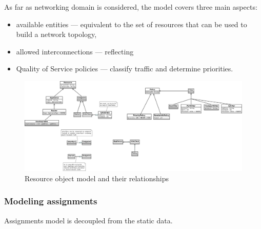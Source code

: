 \documentclass[11pt]{book}
\begin{document}
          As far as networking domain is considered, the model covers three main aspects:

          \begin{itemize}
            \item available entities --- equivalent to the set of resources that can be used to build a network
                  topology,
            \item allowed interconnections --- reflecting %
            \item Quality of Service policies --- classify traffic and determine priorities.
          \end{itemize}

          \begin{figure}[H]
            \begin{center}
              \includegraphics[angle=90, height=0.9\textwidth]{img/impl/resource-object-model.png}
            \end{center}
            \caption{Resource object model and their relationships}
          \end{figure}


        \subsubsection{Modeling assignments}

          Assignments model is decoupled from the static data.
\end{document}
